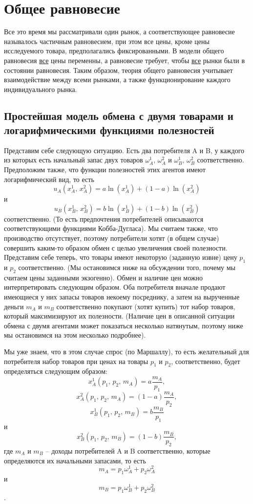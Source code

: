 \section{Общее равновесие}

Все это время мы рассматривали один рынок, а соответствующее равновесие называлось
частичным равновесием, при этом все цены, кроме цены исследуемого товара, предполагались
фиксированными. В модели общего равновесия \underline{все} цены переменны, а
равновесие требует, чтобы \underline{все} рынки были в состоянии равновесия.
Таким образом, теория общего равновесия учитывает взаимодействие между
всеми рынками, а также функционирование каждого индивидуального рынка.

\subsection{Простейшая модель обмена с двумя товарами и логарифмическими функциями полезностей}

Представим себе следующую ситуацию. Есть два потребителя A и B, у каждого из
которых есть начальный запас двух товаров $\omega^1_A,\, \omega^2_A$ и
$\omega^1_B,\, \omega^2_B$ соответственно. Предположим также, что функции
полезностей этих агентов имеют логарифмический вид, то есть
$$u_A(x^1_A,\,x^2_A)=a\ln(x^1_A)+(1-a)\ln(x^2_A)$$ и
$$u_B(x^1_B,\,x^2_B)=b\ln(x^1_B)+(1-b)\ln(x^2_B)$$
соответственно. (То есть предпочтения потребителей описываются
соответствующими функциями Кобба-Дугласа). Мы считаем также, что
производство отсутствует, поэтому потребители хотят (в общем случае)
совершить каким-то образом обмен с целью увеличения своей
полезности. Представим себе теперь, что товары имеют некоторую
(заданную извне) цену $p_1$ и $p_2$ соответственно. (Мы остановимся
ниже на обсуждении того, почему мы считаем цены заданными экзогенно).
Обмен и наличие
цен можно интерпретировать следующим образом. Оба потребителя
вначале продают имеющиеся у них запасы товаров некоему посреднику, а
затем на вырученные деньги $m_A$ и $m_B$ соответственно покупают
(хотят купить) тот набор товаров, который максимизируют их
полезности. (Наличие цен в описанной ситуации обмена с двумя
агентами может показаться несколько натянутым, поэтому ниже мы
остановимся на этом несколько подробнее).

Мы уже знаем, что в этом случае спрос (по Маршаллу), то есть
желательный для потребителя набор товаров при ценах на товары $p_1$
и $p_2$, соответственно, будет определяться следующим образом:
$$x^1_A(p_1,\,p_2,\,m_A)=a\frac{m_A}{p_1},$$
$$x^2_A(p_1,\,p_2,\,m_A)=(1-a)\frac{m_A}{p_2},$$
$$x^1_B(p_1,\,p_2,\,m_B)=b\frac{m_B}{p_1}$$ и
$$x^2_B(p_1,\,p_2,\,m_B)=(1-b)\frac{m_B}{p_2},$$
где $m_A$ и $m_B$ -- доходы потребителей A и B соответственно,
которые определяются их начальными запасами, то есть
$$m_A=p_1\omega^1_A+p_2\omega^2_A$$ и
$$m_B=p_1\omega^1_B+p_2\omega^2_B$$.

